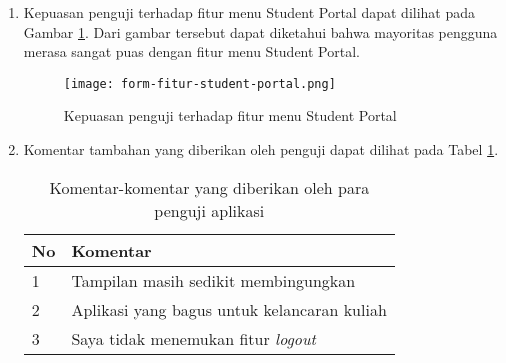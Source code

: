 \begin{enumerate}
\item Kepuasan penguji terhadap fitur menu Student Portal dapat dilihat pada Gambar \ref{responses:feature:stupor}. Dari gambar tersebut dapat diketahui bahwa mayoritas pengguna merasa sangat puas dengan fitur menu Student Portal.
\begin{figure}[H] 
	\centering  
	\texttt{[image: form-fitur-student-portal.png]}  
	\caption[Kepuasan penguji terhadap fitur menu Student Portal] {Kepuasan penguji terhadap fitur menu Student Portal} 
	\label{responses:feature:stupor} 
\end{figure}

\item Komentar tambahan yang diberikan oleh penguji dapat dilihat pada Tabel \ref{responses:comments}.

\begin{table}[ht]
\caption{Komentar-komentar yang diberikan oleh para penguji aplikasi}
\centering
\begin{tabular}{|l | l |}
\hline
\textbf{No} & \textbf{Komentar} \\  \hline
1 &  Tampilan masih sedikit membingungkan \\ \hline
2 & Aplikasi yang bagus untuk kelancaran kuliah \\ \hline
3 &  Saya tidak menemukan fitur \textit{logout} \\ 
\hline
\end{tabular}
\label{responses:comments}
\end{table}

\end{enumerate}



